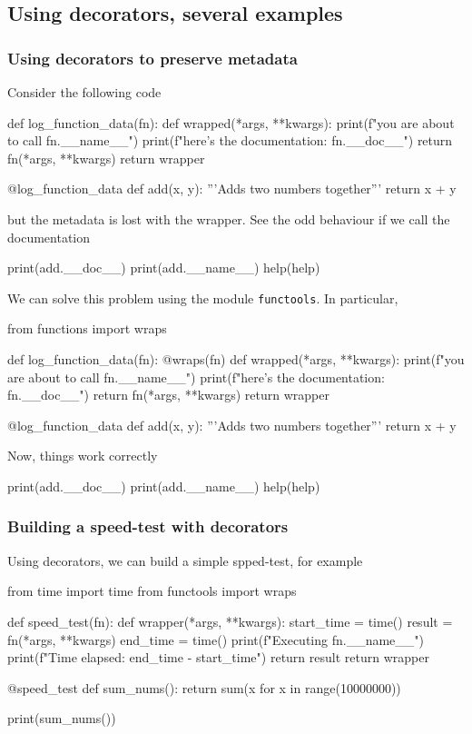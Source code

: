 \subsection{Using decorators, several examples}

\subsubsection{Using decorators to preserve metadata}

Consider the following code 
\begin{listing}{1}
def log_function_data(fn):
    def wrapped(*args, **kwargs):
        print(f"you are about to call {fn.__name__}")
        print(f"here's the documentation: {fn.__doc__}")
        return fn(*args, **kwargs)
    return wrapper 

@log_function_data
def add(x, y):
    '''Adds two numbers together'''
    return x + y
\end{listing}
but the metadata is lost with the wrapper. See the odd behaviour if we call the documentation
\begin{listingcont}
print(add.__doc__)
print(add.__name__)
help(help)    
\end{listingcont}

We can solve this problem using the module \verb|functools|. In particular, 
\begin{listing}{1}
from functions import wraps

def log_function_data(fn):
    @wraps(fn)
    def wrapped(*args, **kwargs):
        print(f"you are about to call {fn.__name__}")
        print(f"here's the documentation: {fn.__doc__}")
        return fn(*args, **kwargs)
    return wrapper 

@log_function_data
def add(x, y):
    '''Adds two numbers together'''
    return x + y
\end{listing}
Now, things work correctly
\begin{listingcont}
print(add.__doc__)
print(add.__name__)
help(help)    
\end{listingcont}

\subsubsection{Building a speed-test with decorators}

Using decorators, we can build a simple spped-test, for example 
\begin{listing}{1}
from time import time 
from functools import wraps 

def speed_test(fn):
    def wrapper(*args, **kwargs):
        start_time = time()
        result = fn(*args, **kwargs)
        end_time = time()
        print(f"Executing {fn.__name__}")
        print(f"Time elapsed: {end_time - start_time}")
        return result 
    return wrapper 

@speed_test 
def sum_nums():
    return sum(x for x in range(10000000))

print(sum_nums())    
\end{listing}

